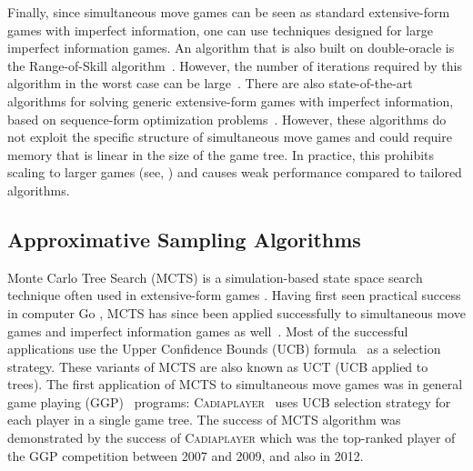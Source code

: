 Finally, since simultaneous move games can be seen as standard extensive-form games with imperfect information, one can use techniques 
designed for large imperfect information games. 
An algorithm that is also built on double-oracle is the Range-of-Skill algorithm~\cite{Zinkevich07New}.  
However, the number of iterations required by this algorithm in the worst case can be large~\cite{Hansen08On}. 
There are also state-of-the-art algorithms for solving generic extensive-form games with imperfect information, based on sequence-form 
optimization problems~\cite{koller1996,Sandholm10The,bosansky2013-aamas}. 
However, these algorithms do not exploit the specific structure of simultaneous move games and could require memory that is linear 
in the size of the game tree. In practice, this prohibits scaling to larger games (see, \eg \cite{Saffidine12SMAB}) and causes weak performance
compared to tailored algorithms.


\subsection{Approximative Sampling Algorithms} \label{sec:related:sampling}

Monte Carlo Tree Search (MCTS) is a simulation-based state space search technique often used in extensive-form games \cite{Coulom06,UCT}. 
Having first seen practical success in computer Go \cite{Gelly2011,Gelly12}, MCTS has since been applied successfully to simultaneous move games and imperfect information games as well~\cite{Ciancarini10Kriegspiel,Cowling12ISMCTS,15aamas-iioos}. 
Most of the successful applications use the Upper Confidence Bounds (UCB) formula~\cite{UCB} as a selection strategy. These variants of MCTS are also known as UCT (UCB applied to trees). The first application of MCTS to simultaneous move games was in general game playing (GGP)~\cite{GGP} programs: \textsc{Cadiaplayer}~\cite{Cadiaplayer,Finnsson12} uses UCB selection strategy for each player in a single game tree. The success of MCTS algorithm was demonstrated by the success of \textsc{Cadiaplayer} which was the top-ranked player of the GGP competition between 2007 and 2009, and also in 2012.

